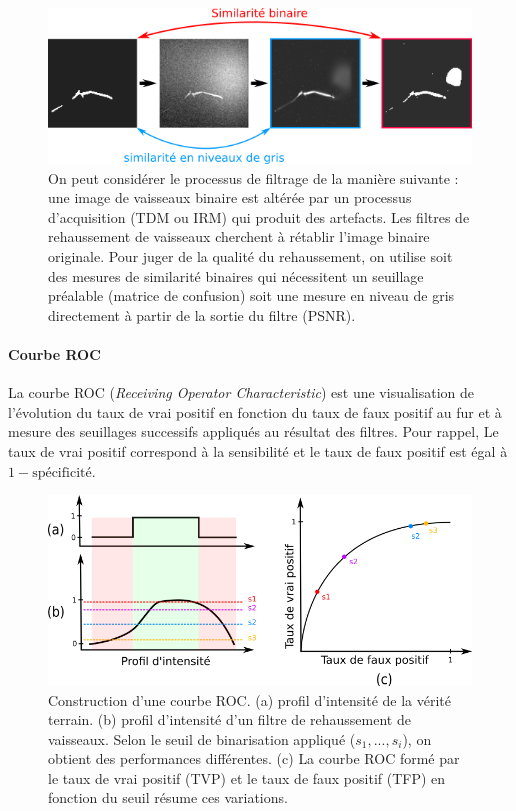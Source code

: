 \begin{figure}[!ht]
  \centering
  \includegraphics[width=\textwidth]{Images/similarity_procedure.png}
  \caption{On peut considérer le processus de filtrage de la manière suivante : une image de vaisseaux binaire est altérée par un processus d'acquisition (TDM ou IRM) qui produit des artefacts. Les filtres de rehaussement de vaisseaux cherchent à rétablir l'image binaire originale. Pour juger de la qualité du rehaussement, on utilise soit des mesures de similarité binaires qui nécessitent un seuillage préalable (matrice de confusion) soit une mesure en niveau de gris directement à partir de la sortie du filtre (PSNR).}
  \label{fig:custom_fig}
\end{figure}


\paragraph{Courbe ROC}

La courbe ROC (\textit{Receiving Operator Characteristic}) est une visualisation de l'évolution du taux de vrai positif en fonction du taux de faux positif au fur et à mesure des seuillages successifs appliqués au résultat des filtres. Pour rappel, Le taux de vrai positif correspond à la sensibilité et le taux de faux positif est égal à $1-\text{spécificité}$. 

\begin{figure}[!ht]
  \centering
  \includegraphics[width=\textwidth]{Images/roc_example.png}
  \caption{Construction d'une courbe ROC. (a) profil d'intensité de la vérité terrain. (b) profil d'intensité d'un filtre de rehaussement de vaisseaux. Selon le seuil de binarisation appliqué ($s_1,...,s_i$), on obtient des performances différentes. (c) La courbe ROC formé par le taux de vrai positif (TVP) et le taux de faux positif (TFP) en fonction du seuil résume ces variations.}
  \label{fig:roc_example}
\end{figure}


